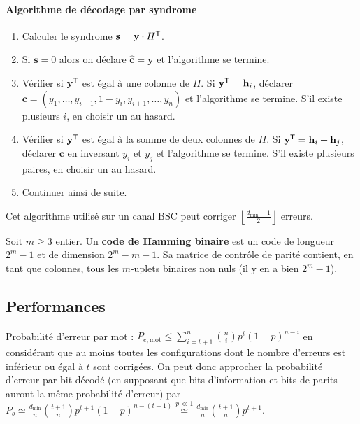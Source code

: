	\paragraph{Algorithme de décodage par syndrome}
		\begin{enumerate}
			\item Calculer le syndrome $\mathbf{s} = \mathbf{y} \cdot {H}^{\mathsf{T}}$.
			\item Si $\mathbf{s} = 0$ alors on déclare $\mathbf{\hat{c}} = \mathbf{y}$ et l'algorithme se termine.
			\item Vérifier si ${\mathbf{y}}^{\mathsf{T}}$ est égal à une colonne de $H$.
				Si ${\mathbf{y}}^{\mathsf{T}} = \mathbf{h}_i$, déclarer $\mathbf{c} = (y_1,\ldots,y_{i - 1},1 - y_i,y_{i + 1},\ldots,y_n)$ et l'algorithme se termine.
				S'il existe plusieurs $i$, en choisir un au hasard.
			\item Vérifier si ${\mathbf{y}}^{\mathsf{T}}$ est égal à la somme de deux colonnes de $H$.
				Si ${\mathbf{y}}^{\mathsf{T}} = \mathbf{h}_i + \mathbf{h}_j$, déclarer $\mathbf{c}$ en inversant $y_i$ et $y_j$ et l'algorithme se termine.
				S'il existe plusieurs paires, en choisir un au hasard.
			\item Continuer ainsi de suite.
		\end{enumerate}

		Cet algorithme utilisé sur un canal BSC peut corriger $\left\lfloor \frac{d_{\min} - 1}{2} \right\rfloor$ erreurs.

	\begin{defn}
		Soit $m \geq 3$ entier.
		Un \textbf{code de Hamming binaire} est un code de longueur $2^m - 1$ et de dimension $2^m - m - 1$.
		Sa matrice de contrôle de parité contient, en tant que colonnes, tous les $m$-uplets binaires non nuls (il y en a bien $2^m - 1$).
	\end{defn}

\subsection{Performances}

	Probabilité d'erreur par mot : $P_{e,\text{mot}} \leq \sum_{i = t + 1}^n \binom{n}{i} p^i (1 - p)^{n - i}$ en considérant que au moins toutes les configurations dont le nombre d'erreurs est inférieur ou égal à $t$ sont corrigées.
	On peut donc approcher la probabilité d'erreur par bit décodé (en supposant que bits d'information et bits de parits auront la même probabilité d'erreur) par $P_b \simeq \frac{d_{\min}}{n} \binom{t + 1}{n} p^{t + 1} (1 - p)^{n - (t - 1)} \overset{p \ll 1}{\simeq} \frac{d_{\min}}{n} \binom{t + 1}{n} p^{t + 1}$.

